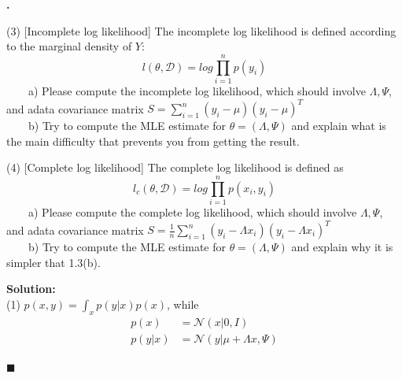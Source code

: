 \documentclass{article}
\newcounter{pcounter}                                   %
\newenvironment{problem}                                %
{                                                       %
    \stepcounter{pcounter}                              %
    \textbf{\arabic{pcounter}.}                         %
}{}                                                     %
\newenvironment{solution}                               %
{\textbf{Solution:} \\}{$\blacksquare$\newline}         %
\newcommand{\tab}{\ \ \ \ }                             %
\newcommand{\Gaussian}{\mathcal{N}}                     %
\newcommand{\IdenMat}{\textit{I}}                       %
\begin{document}
\begin{problem}
        (3) [Incomplete log likelihood] The incomplete log likelihood is defined according to the marginal density of $Y$:
        $$
        l(\theta, \mathcal{D}) = log \prod\limits_{i=1}^{n} p(y_i)
        $$
        \tab a) Please compute the incomplete log likelihood, which should involve $\Lambda, \Psi$, and adata covariance matrix 
        $S=\sum_{i=1}^n (y_i - \mu)(y_i - \mu)^T$ \\
        \tab b) Try to compute the MLE estimate for $\theta = (\Lambda, \Psi)$ and explain what is the main difficulty that prevents you from getting the result.

        (4) [Complete log likelihood] The complete log likelihood is defined as 
        $$
        l_c(\theta, \mathcal{D}) = log \prod\limits_{i=1}^{n} p(x_i, y_i)
        $$
        \tab a) Please compute the complete log likelihood, which should involve $\Lambda, \Psi$, and adata covariance matrix 
        $S=\frac{1}{n} \sum_{i=1}^n (y_i - \Lambda x_i)(y_i - \Lambda x_i)^T$ \\
        \tab b) Try to compute the MLE estimate for $\theta = (\Lambda, \Psi)$ and explain why it is simpler that 1.3(b).
    \end{problem}

    \begin{solution}
        (1) $p(x, y) = \int_x p(y|x) p(x)$, while
        \begin{align*}
            p(x) &= \Gaussian(x | 0, \IdenMat) \\
            p(y|x) &= \Gaussian(y | \mu+\Lambda x, \Psi) \\
        \end{align*}

    \end{solution}
\end{document}
